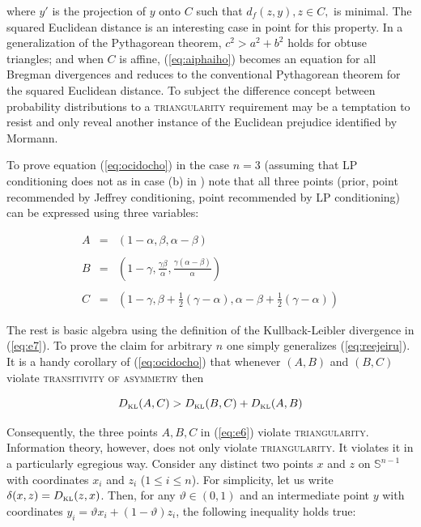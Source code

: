 \documentclass[12pt]{article}
\begin{document}
{\noindent}where $y'$ is the projection of $y$ onto $C$ such that
$d_{f}(z,y),z\in{}C,$ is minimal. The squared Euclidean distance is an
interesting case in point for this property. In a generalization of
the Pythagorean theorem, $c^{2}>a^{2}+b^{2}$ holds for obtuse
triangles; and when $C$ is affine, (\ref{eq:aiphaiho}) becomes an
equation for all Bregman divergences and reduces to the conventional
Pythagorean theorem for the squared Euclidean distance. To subject the
difference concept between probability distributions to a
\textsc{triangularity} requirement may be a temptation to resist and
only reveal another instance of the Euclidean prejudice identified by
Mormann.

To prove equation (\ref{eq:ocidocho}) in the case $n=3$ (assuming that
LP conditioning does not  as in case (b) in
) note that all three points
(prior, point recommended by Jeffrey conditioning, point recommended
by LP conditioning) can be expressed using three variables:

\begin{equation}
  \label{eq:reejeiru}
  \begin{array}{rcl}
    A&=&\left(1-\alpha,\beta,\alpha-\beta\right) \\
     && \\
    B&=&\left(1-\gamma,\frac{\gamma\beta}{\alpha},\frac{\gamma(\alpha-\beta)}{\alpha}\right) \\
     && \\
    C&=&\left(1-\gamma,\beta+\frac{1}{2}(\gamma-\alpha),\alpha-\beta+\frac{1}{2}(\gamma-\alpha)\right)
  \end{array}
\end{equation}

The rest is basic algebra using the definition of the Kullback-Leibler
divergence in (\ref{eq:e7}). To prove the claim for arbitrary $n$
one simply generalizes (\ref{eq:reejeiru}). It is a handy corollary of
(\ref{eq:ocidocho}) that whenever $(A,B)$ and $(B,C)$ violate
\textsc{transitivity of asymmetry} then 

\begin{equation}
  \label{eq:saithain}
  D_{\mbox{\tiny KL}}(A,C)>D_{\mbox{\tiny KL}}(B,C)+D_{\mbox{\tiny KL}}(A,B)
\end{equation}

Consequently, the three points $A,B,C$ in (\ref{eq:e6}) violate
\textsc{triangularity}. Information theory, however, does not only
violate \textsc{triangularity}. It violates it in a particularly
egregious way. Consider any distinct two points $x$ and $z$ on
$\mathbb{S}^{n-1}$ with coordinates $x_{i}$ and $z_{i}$
($1\leq{}i\leq{}n$). For simplicity, let us write
$\delta(x,z)=D_{\mbox{\tiny KL}}(z,x)$. Then, for any
$\vartheta\in{}(0,1)$ and an intermediate point $y$ with coordinates
$y_{i}=\vartheta{}x_{i}+(1-\vartheta)z_{i}$, the following inequality
holds true:
\end{document}
